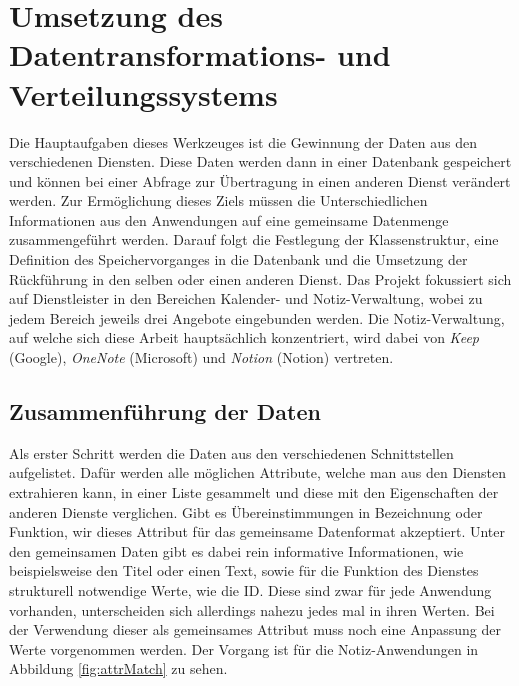 \chapter{Umsetzung des Datentransformations- und Verteilungssystems}

Die Hauptaufgaben dieses Werkzeuges ist die Gewinnung der Daten aus den verschiedenen Diensten. Diese Daten werden dann in einer Datenbank gespeichert und können bei einer Abfrage zur Übertragung in einen anderen Dienst verändert werden. Zur Ermöglichung dieses Ziels müssen die Unterschiedlichen Informationen aus den Anwendungen auf eine gemeinsame Datenmenge zusammengeführt werden. Darauf folgt die Festlegung der Klassenstruktur, eine Definition des Speichervorganges in die Datenbank und die Umsetzung der Rückführung in den selben oder einen anderen Dienst. Das Projekt fokussiert sich auf Dienstleister in den Bereichen Kalender- und Notiz-Verwaltung, wobei zu jedem Bereich jeweils drei Angebote eingebunden werden. Die Notiz-Verwaltung, auf welche sich diese Arbeit hauptsächlich konzentriert, wird dabei von \textit{Keep} (Google), \textit{OneNote} (Microsoft) und \textit{Notion} (Notion) vertreten.

\section{Zusammenführung der Daten}

Als erster Schritt werden die Daten aus den verschiedenen Schnittstellen aufgelistet. Dafür werden alle möglichen Attribute, welche man aus den Diensten extrahieren kann, in einer Liste gesammelt und diese mit den Eigenschaften der anderen Dienste verglichen. Gibt es Übereinstimmungen in Bezeichnung oder Funktion, wir dieses Attribut für das gemeinsame Datenformat akzeptiert. Unter den gemeinsamen Daten gibt es dabei rein informative Informationen, wie beispielsweise den Titel oder einen Text, sowie für die Funktion des Dienstes strukturell notwendige Werte, wie die ID. Diese sind zwar für jede Anwendung vorhanden, unterscheiden sich allerdings nahezu jedes mal in ihren Werten. Bei der Verwendung dieser als gemeinsames Attribut muss noch eine Anpassung der Werte vorgenommen werden. Der Vorgang ist für die Notiz-Anwendungen in Abbildung \ref{fig:attrMatch} zu sehen.\\

